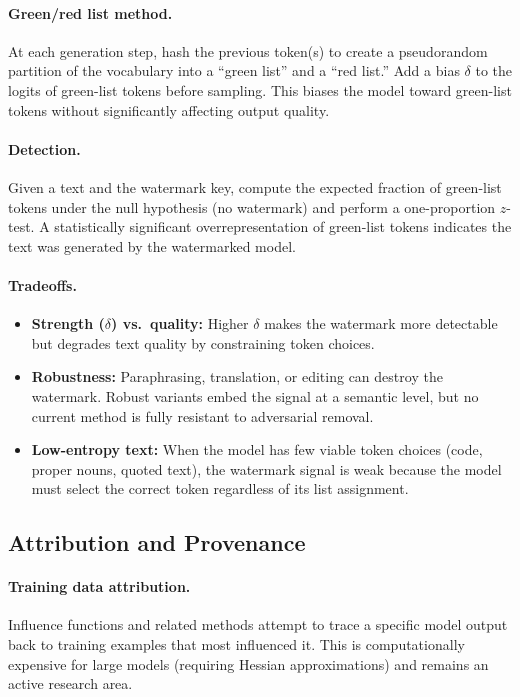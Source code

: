 \paragraph{Green/red list method.}
At each generation step, hash the previous token(s) to create a pseudorandom
partition of the vocabulary into a ``green list'' and a ``red list.''  Add a
bias $\delta$ to the logits of green-list tokens before sampling.  This biases
the model toward green-list tokens without significantly affecting output
quality.

\paragraph{Detection.}
Given a text and the watermark key, compute the expected fraction of green-list
tokens under the null hypothesis (no watermark) and perform a one-proportion
$z$-test.  A statistically significant overrepresentation of green-list tokens
indicates the text was generated by the watermarked model.

\paragraph{Tradeoffs.}
\begin{itemize}
    \item \textbf{Strength ($\delta$) vs.\ quality:} Higher $\delta$ makes
    the watermark more detectable but degrades text quality by constraining
    token choices.
    \item \textbf{Robustness:} Paraphrasing, translation, or editing can
    destroy the watermark.  Robust variants embed the signal at a semantic
    level, but no current method is fully resistant to adversarial removal.
    \item \textbf{Low-entropy text:} When the model has few viable token
    choices (code, proper nouns, quoted text), the watermark signal is
    weak because the model must select the correct token regardless of
    its list assignment.
\end{itemize}

\subsection{Attribution and Provenance}

\paragraph{Training data attribution.}
Influence functions and related methods attempt to trace a specific model output
back to training examples that most influenced it.  This is computationally
expensive for large models (requiring Hessian approximations) and remains an
active research area.


